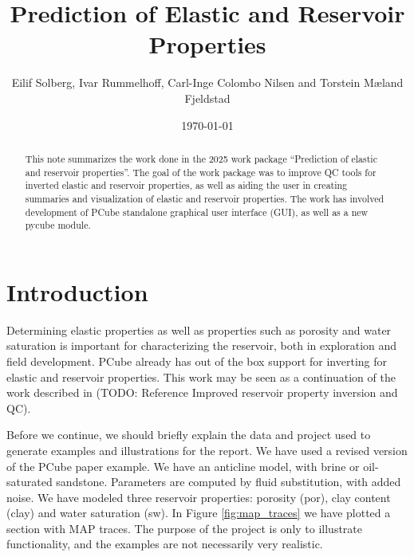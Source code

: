 \documentclass[note,screen,english,12pt,utf8]{nrdoc}
\begin{document}
\title{Prediction of Elastic and Reservoir Properties}
\author{Eilif Solberg, Ivar Rummelhoff, Carl-Inge Colombo Nilsen and Torstein Mæland Fjeldstad}
\date{\today}

\maketitle

\begin{abstract}
This note summarizes the work done in the 2025 work package
``Prediction of elastic and reservoir properties''. The goal of the work package
was to improve QC tools for inverted elastic and reservoir properties, as well as aiding
the user in creating summaries and visualization of elastic and reservoir properties.
The work has involved development of PCube standalone graphical user interface (GUI),
as well as a new pycube module.
\end{abstract}

\tableofcontents %

\section{Introduction}


Determining elastic properties as well as properties such as
porosity and water saturation is important for characterizing
the reservoir, both in exploration and field development.
PCube already has out of the box support for inverting for
elastic and reservoir properties. This work may be seen
as a continuation of the work described in (TODO: Reference
    Improved reservoir property inversion and QC).

Before we continue, we should briefly explain the data and
project used to generate examples and illustrations for the report.
We have used a revised version of the PCube paper
example. We have an anticline model, with brine or oil-saturated
sandstone. Parameters are computed by fluid substitution, with
added noise. We have modeled three reservoir properties:
porosity (por), clay content (clay) and water saturation (sw). In Figure
\ref{fig:map_traces} we have plotted a section with MAP traces.
The purpose of the project is only to illustrate functionality, and
the examples are not necessarily very realistic.
\end{document}
